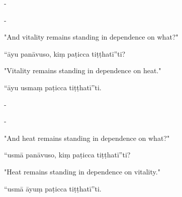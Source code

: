 \begin{samepage}
\begin{leftcolumn*}
-
\end{leftcolumn*}

\begin{rightcolumn}
-
\end{rightcolumn}
\end{samepage}

\begin{samepage}
\begin{leftcolumn*}
"And vitality remains standing in dependence on what?"
\end{leftcolumn*}

\begin{rightcolumn}
“āyu panāvuso, kiṃ paṭicca tiṭṭhatī”ti?
\end{rightcolumn}
\end{samepage}

\begin{samepage}
\begin{leftcolumn*}
"Vitality remains standing in dependence on heat."
\end{leftcolumn*}

\begin{rightcolumn}
“āyu usmaṃ paṭicca tiṭṭhatī”ti.
\end{rightcolumn}
\end{samepage}

\begin{samepage}
\begin{leftcolumn*}
-
\end{leftcolumn*}

\begin{rightcolumn}
-
\end{rightcolumn}
\end{samepage}

\begin{samepage}
\begin{leftcolumn*}
"And heat remains standing in dependence on what?"
\end{leftcolumn*}

\begin{rightcolumn}
“usmā panāvuso, kiṃ paṭicca tiṭṭhatī”ti?
\end{rightcolumn}
\end{samepage}

\begin{samepage}
\begin{leftcolumn*}
"Heat remains standing in dependence on vitality."
\end{leftcolumn*}

\begin{rightcolumn}
“usmā āyuṃ paṭicca tiṭṭhatī”ti.
\end{rightcolumn}
\end{samepage}

